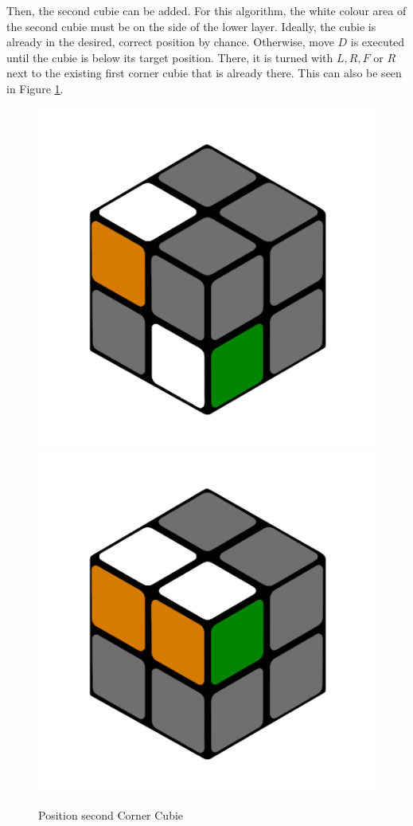 \documentclass[12pt,a4paper]{article}
\theoremstyle{custom}
\begin{document}
Then, the second cubie can be added. For this algorithm, the white colour area of the second cubie must be on the side of the lower layer.
Ideally, the cubie is already in the desired, correct position by chance.
Otherwise, move $D$ is executed until the cubie is below its target position.  There, it is turned with $L, R, F$ or $R$ next to the existing first corner cubie that is already there. This can also be seen in Figure \ref{Figure_SecondCornercubie}.

\begin{figure}[H]
\centering
\includegraphics[scale=0.14]{e1_s2_s1.png}
\includegraphics[scale=0.14]{e1_s2_s2.png}
\caption{Position second Corner Cubie}
\label{Figure_SecondCornercubie}
\end{figure}
\end{document}
